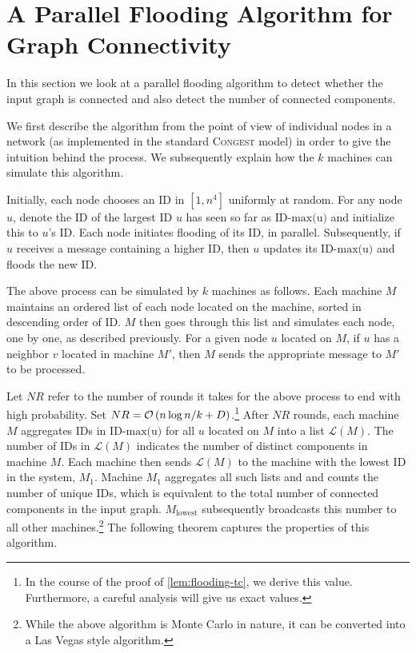 \section{A Parallel Flooding Algorithm for Graph Connectivity}\label{sec:congest-connectivity}
In this section we look at a parallel flooding algorithm to detect whether the input graph is connected and also detect the number of connected components.

We first describe the algorithm from the point of view of individual nodes in a network (as implemented in the standard \textsc{Congest} model) in order to give the intuition behind the process. We subsequently explain how the $k$ machines can simulate this algorithm.

Initially, each node chooses an ID in $[1,n^4]$ uniformly at random. 
For any node $u$, denote the ID of the largest ID $u$ has seen so far as $\textrm{ID-max(u)}$ and initialize this to $u$'s ID. Each node initiates flooding of its ID, in parallel.  Subsequently, if $u$ receives a message containing a higher ID, then $u$ updates its $\textrm{ID-max(u)}$ and floods the new ID.

The above process can be simulated by $k$ machines as follows. Each machine $M$ maintains an ordered list of each node located on the machine, sorted in descending order of ID. $M$ then goes through this list and simulates each node, one by one, as described previously. For a given node $u$ located on $M$, if $u$ has a neighbor $v$ located in machine $M'$, then $M$ sends the appropriate message to $M'$ to be processed.

Let $NR$ refer to the number of rounds it takes for the above process to end
with high probability. Set $NR = \mathcal{O}\left(n\log n/k + D\right)$.\footnote{In the course
of the proof of \cref{lem:flooding-tc}, we derive this value. Furthermore, a
careful analysis will give us exact values.} After $NR$ rounds, each machine
$M$ aggregates IDs in $\textrm{ID-max(u)}$ for all $u$ located on $M$ into a
list $\mathcal{L}(M)$. The number of IDs in $\mathcal{L}(M)$ indicates the number of distinct components in machine $M$.
Each machine then sends $\mathcal{L}(M)$ to the machine
with the lowest ID in the system, $M_1$. Machine $M_1$ aggregates all such lists
and and counts the number of unique IDs, which is equivalent to the total number
of connected components in the input graph. $M_{\mathrm{lowest}}$ subsequently
broadcasts this number to all other machines.\footnote{While the above algorithm is Monte Carlo in nature, it can be converted into a Las Vegas style algorithm.}
The following theorem captures the properties of this algorithm.


